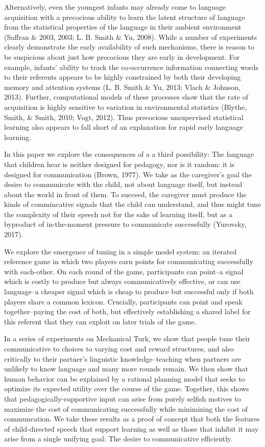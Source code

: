 \documentclass[10pt, letterpaper]{article}
\begin{document}
Alternatively, even the youngest infants may already come to language
acquisition with a precocious ability to learn the latent structure of
language from the statistical properties of the language in their
ambient environment (Saffran \& 2003, 2003; L. B. Smith \& Yu, 2008).
While a number of experiments clearly demonstrate the early availability
of such mechanisms, there is reason to be suspicious about just how
precocious they are early in development. For example, infants' ability
to track the co-occurrence information connecting words to their
referents appears to be highly constrained by both their developing
memory and attention systems (L. B. Smith \& Yu, 2013; Vlach \& Johnson,
2013). Further, computational models of these processes show that the
rate of acquisition is highly sensitive to variation in environmental
statistics (Blythe, Smith, \& Smith, 2010; Vogt, 2012). Thus precocious
unsupervised statistical learning also appears to fall short of an
explanation for rapid early language learning.

In this paper we explore the consequences of a a third possibility: The
language that children hear is neither designed for pedagogy, nor is it
random: it is designed for communication (Brown, 1977). We take as the
caregiver's goal the desire to communicate with the child, not about
language itself, but instead about the world in front of them. To
succeed, the caregiver must produce the kinds of commincative signals
that the child can understand, and thus might tune the complexity of
their speech not for the sake of learning itself, but as a byproduct of
in-the-moment pressure to communicate successfully (Yurovsky, 2017).

We explore the emergence of tuning in a simple model system: an iterated
reference game in which two players earn points for communicating
successfully with each-other. On each round of the game, participants
can point--a signal which is costly to produce but always
communicatively effective, or can use language--a cheaper signal which
is cheap to produce but successful only if both players share a common
lexicon. Crucially, participants can point and speak together--paying
the cost of both, but effectively establishing a shared label for this
referent that they can exploit on later trials of the game.

In a series of experiments on Mechanical Turk, we show that people tune
their communicative to choices to varying cost and reward structures,
and also critically to their partner's linguistic knowledge--teaching
when partners are unlikely to know language and many more rounds remain.
We then show that human behavior can be explained by a rational planning
model that seeks to optimize its expected utility over the course of the
game. Together, this shows that pedagogically-supportive input can arise
from purely selfish motives to maximize the cost of communicating
successfully while minimizing the cost of communcation. We take these
results as a proof of concept that both the features of child-directed
speech that support learning as well as those that inhibit it may arise
from a single unifying goal: The desire to communicative efficiently.
\end{document}
